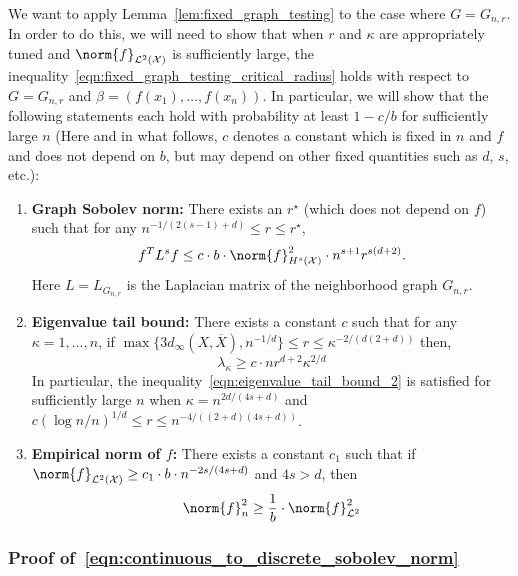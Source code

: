\documentclass{article}
\newcommand{\1}{\mathbf{1}}
\newcommand{\Xset}{\mathcal{X}}
\newcommand{\Leb}{\mathcal{L}}
\newcommand{\ol}[1]{\overline{#1}}
\theoremstyle{alden}
\theoremstyle{aldenthm}
\theoremstyle{definition}
\theoremstyle{remark}
\begin{document}
We want to apply Lemma~\ref{lem:fixed_graph_testing} to the case where $G = G_{n,r}$. In order to do this, we will need to show that when $r$ and $\kappa$ are appropriately tuned and $\norm{f}_{\Leb^2(\mathcal{X})}$ is sufficiently large, the inequality~\eqref{eqn:fixed_graph_testing_critical_radius} holds with respect to $G = G_{n,r}$ and $\beta = (f(x_1),\ldots,f(x_n))$. In particular, we will show that the following statements each hold with probability at least $1 - c/b$ for sufficiently large $n$ (Here and in what follows, $c$ denotes a constant which is fixed in $n$ and $f$ and does not depend on $b$, but may depend on other fixed quantities such as $d$, $s$, etc.): 
\begin{enumerate}[label=(E\arabic*)]
	\item 
	\label{event:discrete_sobolev_norm}
	\textbf{Graph Sobolev norm:} There exists an $r^{\star}$ (which does not depend on $f$) such that for any $n^{-1/(2(s - 1) + d)}\leq r \leq r^{\star}$,
	\begin{equation}
	\label{eqn:continuous_to_discrete_sobolev_norm}
	f^T L^s f \leq c \cdot b \cdot \norm{f}_{H^s(\Xset)}^2 \cdot n^{s + 1} r^{s(d + 2)}.
	\end{equation}
	Here $L = L_{G_{n,r}}$ is the Laplacian matrix of the neighborhood graph $G_{n,r}$.
	\item 
	\label{event:eigenvalue_tail_decay_2}
	\textbf{Eigenvalue tail bound:} There exists a constant $c$ such that for any $\kappa = 1,\ldots,n$, if $\max\{ 3 d_{\infty}(X,\ol{X}),n^{-1/d}\} \leq r \leq \kappa^{-2/(d(2 +d))}$ then,
	\begin{equation}
	\label{eqn:eigenvalue_tail_bound_2}
	\lambda_{\kappa} \geq c \cdot n r^{d + 2} \kappa^{2/d}
	\end{equation}
	In particular, the inequality~\eqref{eqn:eigenvalue_tail_bound_2} is satisfied for sufficiently large $n$ when $\kappa = n^{2d/(4s + d)}$ and $c(\log n/n)^{1/d} \leq r \leq n^{-4/((2+d)(4s + d))}$. 
	\item 
	\label{event:l2_norm_order1}
	\textbf{Empirical norm of $f$:} There exists a constant $c_1$ such that if $\norm{f}_{\Leb^2(\Xset)} \geq c_1 \cdot b \cdot n^{-2s/(4s + d)}$ and $4s > d$, then
	\begin{equation}
	\label{eqn:l2_to_empirical_norm_order1}
	\norm{f}_n^2 \geq \frac{1}{b} \cdot \norm{f}_{\Leb^2}^2
	\end{equation}
\end{enumerate} 

\subsubsection{Proof of~\eqref{eqn:continuous_to_discrete_sobolev_norm}}
\end{document}

